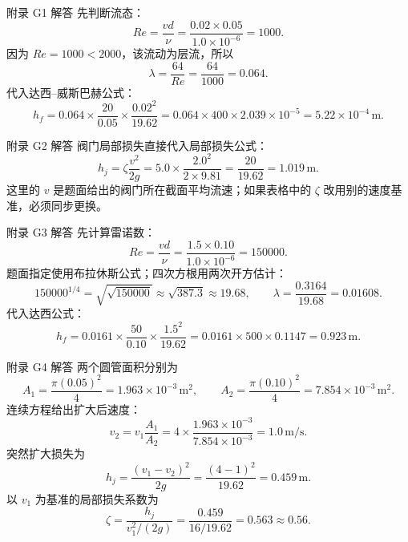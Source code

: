 \documentclass[aspectratio=169,10pt]{beamer}
\newcommand{\Rey}{\mathit{Re}}
\begin{document}
\appendix
{}

\begin{frame}{附录 G1 解答}
  \footnotesize
  先判断流态：
  \[
    \Rey=\frac{vd}{\nu}
    =
    \frac{0.02\times0.05}{1.0\times10^{-6}}
    =
    1000 .
    \tag{H47}
  \]
  因为 $\Rey=1000<2000$，该流动为层流，所以
  \[
    \lambda=\frac{64}{\Rey}
    =
    \frac{64}{1000}
    =
    0.064 .
    \tag{H48}
  \]
  代入达西--威斯巴赫公式：
  \[
    h_f
    =
    0.064\times\frac{20}{0.05}\times\frac{0.02^2}{19.62}
    =
    0.064\times400\times2.039\times10^{-5}
    =
    5.22\times10^{-4}\,\mathrm m .
    \tag{H49}
  \]
  \TLresultblock{答案}{
    \[
      \boxed{\Rey=1000,\quad \lambda=0.064,\quad h_f\approx5.2\times10^{-4}\,\mathrm m.}
    \]
  }
\end{frame}

\begin{frame}{附录 G2 解答}
  \footnotesize
  阀门局部损失直接代入局部损失公式：
  \[
    h_j
    =
    \zeta\frac{v^2}{2g}
    =
    5.0\times\frac{2.0^2}{2\times9.81}
    =
    \frac{20}{19.62}
    =
    1.019\,\mathrm m .
    \tag{H50}
  \]
  这里的 $v$ 是题面给出的阀门所在截面平均流速；如果表格中的 $\zeta$ 改用别的速度基准，必须同步更换。
\end{frame}

\begin{frame}{附录 G3 解答}
  \footnotesize
  先计算雷诺数：
  \[
    \Rey
    =
    \frac{vd}{\nu}
    =
    \frac{1.5\times0.10}{1.0\times10^{-6}}
    =
    150000 .
    \tag{H51}
  \]
  题面指定使用布拉休斯公式；四次方根用两次开方估计：
  \[
    150000^{1/4}
    =
    \sqrt{\sqrt{150000}}
    \approx
    \sqrt{387.3}
    \approx
    19.68,\qquad
    \lambda=\frac{0.3164}{19.68}=0.01608 .
    \tag{H52}
  \]
  代入达西公式：
  \[
    h_f
    =
    0.0161\times\frac{50}{0.10}\times\frac{1.5^2}{19.62}
    =
    0.0161\times500\times0.1147
    =
    0.923\,\mathrm m .
    \tag{H53}
  \]
  \TLresultblock{答案}{
    \[
      \boxed{\Rey=1.5\times10^5,\quad \lambda\approx0.0161,\quad h_f\approx0.92\,\mathrm m.}
    \]
  }
\end{frame}

\begin{frame}{附录 G4 解答}
  \footnotesize
  两个圆管面积分别为
  \[
    A_1=\frac{\pi(0.05)^2}{4}=1.963\times10^{-3}\,\mathrm{m^2},
    \qquad
    A_2=\frac{\pi(0.10)^2}{4}=7.854\times10^{-3}\,\mathrm{m^2}.
    \tag{H54}
  \]
  连续方程给出扩大后速度：
  \[
    v_2
    =
    v_1\frac{A_1}{A_2}
    =
    4\times\frac{1.963\times10^{-3}}{7.854\times10^{-3}}
    =
    1.0\,\mathrm{m/s}.
    \tag{H55}
  \]
  突然扩大损失为
  \[
    h_j=\frac{(v_1-v_2)^2}{2g}
    =
    \frac{(4-1)^2}{19.62}
    =
    0.459\,\mathrm m .
    \tag{H56}
  \]
  以 $v_1$ 为基准的局部损失系数为
  \[
    \zeta
    =
    \frac{h_j}{v_1^2/(2g)}
    =
    \frac{0.459}{16/19.62}
    =
    0.563\approx0.56.
    \tag{H57}
  \]
\end{frame}
\end{document}

